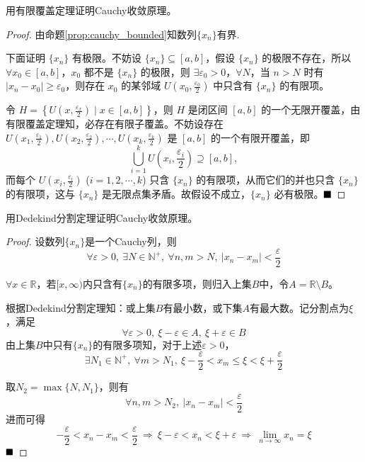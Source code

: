 \begin{problem}
    用有限覆盖定理证明Cauchy收敛原理。
\end{problem}

\begin{proof}
    由命题\ref{prop:cauchy_bounded}知数列$\{x_n\}$有界.

        下面证明 $\{x_n\}$ 有极限。不妨设 $\{x_n\} \subseteq [a,b]$，假设 $\{x_n\}$ 的极限不存在，所以 $\forall x_0 \in [a,b]$，$x_0$ 都不是 $\{x_n\}$ 的极限，则 $\exists \varepsilon_0 > 0$，$\forall N$，当 $n > N$ 时有 $|x_n - x_0| \geq \varepsilon_0$，则存在 $x_0$ 的某邻域 $U\left(x_0, \frac{\varepsilon_0}{2}\right)$ 中只含有 $\{x_n\}$ 的有限项。
        
        令 $H = \left\{ U\left( x, \frac{\varepsilon_x}{2} \right) \mid x \in [a,b] \right\}$，则 $H$ 是闭区间 $[a,b]$ 的一个无限开覆盖，由有限覆盖定理知，必存在有限子覆盖。不妨设存在 $U\left(x_1, \frac{\varepsilon_1}{2}\right), U\left(x_2, \frac{\varepsilon_2}{2}\right), \cdots, U\left(x_k, \frac{\varepsilon_k}{2}\right)$ 是 $[a,b]$ 的一个有限开覆盖，即
        \[
        \bigcup_{i=1}^{k} U\left( x_i, \frac{\varepsilon_i}{2} \right) \supseteq [a,b],
        \]
        而每个 $U\left(x_i, \frac{\varepsilon_i}{2}\right)$ ($i=1,2,\cdots,k$) 只含 $\{x_n\}$ 的有限项，从而它们的并也只含 $\{x_n\}$ 的有限项，这与 $\{x_n\}$ 是无限点集矛盾。故假设不成立，$\{x_n\}$ 必有极限。$\hfill \blacksquare$
\end{proof}

\begin{problem}
    用Dedekind分割定理证明Cauchy收敛原理。
\end{problem}

\begin{proof}
    设数列$\{x_n\}$是一个Cauchy列，则
    \[
    \forall \varepsilon >0,\ \exists N \in \mathbb{N}^+,\ \forall n,m>N,\ |x_n -x_m|<\frac{\varepsilon}{2}
    \]
    
    $\forall x \in \mathbb{R}$，若$[x,\infty)$内只含有$\{x_{n}\}$的有限多项，则归入上集$B$中，令$A=\mathbb{R} \setminus B$。
    
    根据Dedekind分割定理知：或上集$B$有最小数，或下集$A$有最大数。记分割点为$\xi$，满足
    \[
    \forall \varepsilon>0,\ \xi -\varepsilon \in A,\ \xi+\varepsilon \in B
    \]
    由上集$B$中只有$\{x_{n}\}$的有限多项知，对于上述$\varepsilon>0$，
    \[
    \exists N_1 \in \mathbb{N}^{+},\ \forall m>N_1,\ \xi -\frac{\varepsilon}{2}<x_m \leq\xi<\xi+\frac{\varepsilon}{2}
    \]
    
    取$N_2 =\max \{N,N_1\}$，则有
    \[
    \forall n,m > N_2,\ |x_n -x_m|<\frac{\varepsilon}{2}
    \]
    进而可得
    \[
    -\frac{\varepsilon}{2}<x_n -x_m<\frac{\varepsilon}{2} \ \Rightarrow\ \xi -\varepsilon<x_n <\xi+\varepsilon \ \Rightarrow\ \lim_{n \to \infty}x_n = \xi
    \] $\hfill \blacksquare$
\end{proof}


